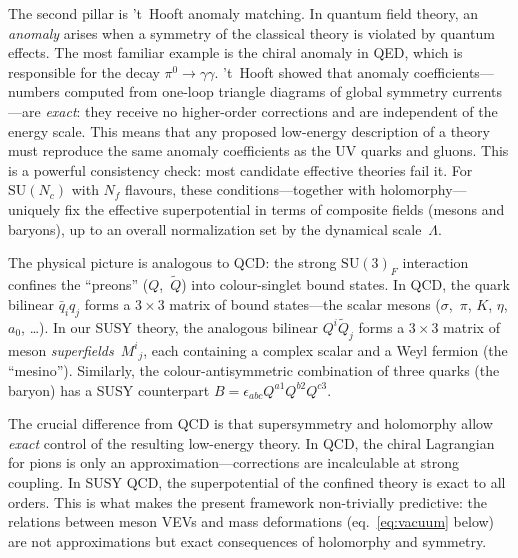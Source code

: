 \documentclass[12pt,a4paper]{article}
\newcommand{\SU}{\mathrm{SU}}
\newcommand{\Nf}{N_f}
\newcommand{\Nc}{N_c}
\begin{document}
The second pillar is 't~Hooft anomaly matching.
In quantum field theory, an \emph{anomaly} arises when a symmetry
of the classical theory is violated by quantum effects. The most
familiar example is the chiral anomaly in QED, which is responsible
for the decay $\pi^0 \to \gamma\gamma$. 't~Hooft showed that
anomaly coefficients---numbers computed from one-loop triangle diagrams
of global symmetry currents---are \emph{exact}: they receive no
higher-order corrections and are independent of the energy scale.
This means that any proposed low-energy description of a theory
must reproduce the same anomaly coefficients as the UV quarks and
gluons. This is a powerful consistency check: most candidate
effective theories fail it.
For $\SU(\Nc)$ with $\Nf$ flavours, these conditions---together
with holomorphy---uniquely fix the effective superpotential
in terms of composite fields (mesons and baryons), up to an
overall normalization set by the dynamical scale~$\Lambda$.

The physical picture is analogous to QCD: the strong $\SU(3)_F$
interaction confines the ``preons'' ($Q$,~$\tilde Q$) into
colour-singlet bound states. In QCD, the quark bilinear
$\bar q_i q_j$ forms a $3\times3$ matrix of bound states---the
scalar mesons ($\sigma$,~$\pi$, $K$, $\eta$, $a_0$, \ldots). In our
SUSY theory, the analogous bilinear $Q^i\tilde Q_j$ forms a
$3\times3$ matrix of meson \emph{superfields}~$M^i{}_j$, each
containing a complex scalar and a Weyl fermion (the ``mesino'').
Similarly, the colour-antisymmetric combination of three quarks
(the baryon) has a SUSY counterpart
$B = \epsilon_{abc} Q^{a1} Q^{b2} Q^{c3}$.

The crucial difference from QCD is that supersymmetry and holomorphy
allow \emph{exact} control of the resulting low-energy theory.
In QCD, the chiral Lagrangian for pions is only an
approximation---corrections are incalculable at strong coupling.
In SUSY QCD, the superpotential of the confined theory is exact
to all orders.  This is what makes the present framework
non-trivially predictive: the relations between
meson VEVs and mass deformations (eq.~\ref{eq:vacuum} below)
are not approximations but exact consequences of holomorphy and symmetry.
\end{document}
